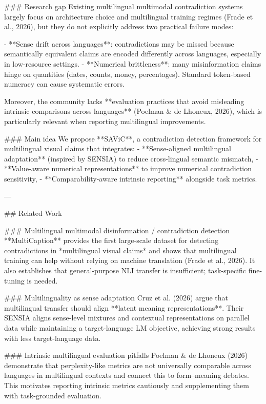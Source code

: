 ### Research gap  
Existing multilingual multimodal contradiction systems largely focus on architecture choice and multilingual training regimes (Frade et al., 2026), but they do not explicitly address two practical failure modes:

- **Sense drift across languages**: contradictions may be missed because semantically equivalent claims are encoded differently across languages, especially in low-resource settings.
- **Numerical brittleness**: many misinformation claims hinge on quantities (dates, counts, money, percentages). Standard token-based numeracy can cause systematic errors.

Moreover, the community lacks **evaluation practices that avoid misleading intrinsic comparisons across languages** (Poelman & de Lhoneux, 2026), which is particularly relevant when reporting multilingual improvements.

### Main idea  
We propose **SAViC**, a contradiction detection framework for multilingual visual claims that integrates:
- **Sense-aligned multilingual adaptation** (inspired by SENSIA) to reduce cross-lingual semantic mismatch,
- **Value-aware numerical representations** to improve numerical contradiction sensitivity,
- **Comparability-aware intrinsic reporting** alongside task metrics.

---

## Related Work  

### Multilingual multimodal disinformation / contradiction detection  
**MultiCaption** provides the first large-scale dataset for detecting contradictions in *multilingual visual claims* and shows that multilingual training can help without relying on machine translation (Frade et al., 2026). It also establishes that general-purpose NLI transfer is insufficient; task-specific fine-tuning is needed.

### Multilinguality as sense adaptation  
Cruz et al. (2026) argue that multilingual transfer should align **latent meaning representations**. Their SENSIA aligns sense-level mixtures and contextual representations on parallel data while maintaining a target-language LM objective, achieving strong results with less target-language data.

### Intrinsic multilingual evaluation pitfalls  
Poelman & de Lhoneux (2026) demonstrate that perplexity-like metrics are not universally comparable across languages in multilingual contexts and connect this to form–meaning debates. This motivates reporting intrinsic metrics cautiously and supplementing them with task-grounded evaluation.

